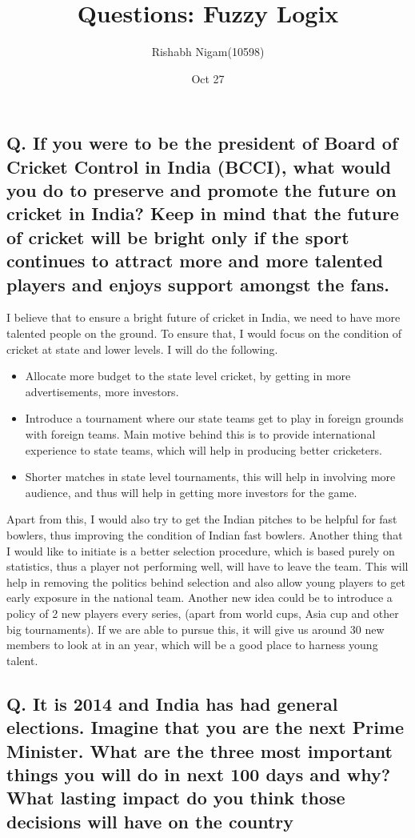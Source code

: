 \documentclass{article}
\title{Questions: Fuzzy Logix}
\author{Rishabh Nigam(10598) }
\date{Oct 27}
\begin{document}
\maketitle
\subsection*{Q. If you were to be the president of Board of Cricket Control in India (BCCI), what would you do to preserve and promote the future on cricket in India? Keep in mind that the future of cricket will be bright only if the sport continues to attract more and more talented players and enjoys support amongst the fans.}

I believe that to ensure a bright future of cricket in India, we need to have more talented people on the ground. To ensure that, I would focus on the condition of cricket at state and lower levels. I will do the following.
\begin{itemize}
\item Allocate more budget to the state level cricket, by getting in more advertisements, more investors.
\item Introduce a tournament where our state teams get to play in foreign grounds with foreign teams. Main motive behind this is to provide international experience to state teams, which will help in producing better cricketers. 
\item Shorter matches in state level tournaments, this will help in involving more audience, and thus will help in getting more investors for the game.
\end{itemize}

Apart from this, I would also try to get the Indian pitches to be helpful for fast bowlers, thus improving the condition of Indian fast bowlers. Another thing that I would like to initiate is a better selection procedure, which is based purely on statistics, thus a player not performing well, will have to leave the team. This will help in removing the politics behind selection and also allow young players to get early exposure in the national team. Another new idea could be to introduce a policy of 2 new players every series, (apart from world cups, Asia cup and other big tournaments). If we are able to pursue this, it will give us around 30 new members to look at in an year, which will be a good place to harness young talent.


\subsection*{Q. It is 2014 and India has had general elections. Imagine that you are the next Prime Minister. What are the three most important things you will do in next 100 days and why? What lasting impact do you think those decisions will have on the country}
\end{document}

